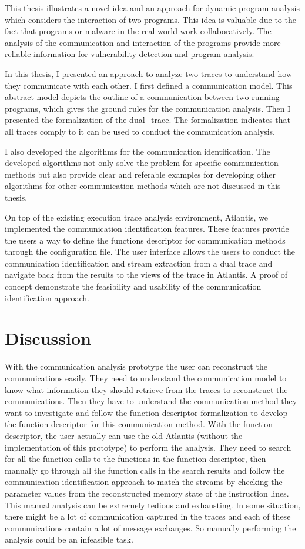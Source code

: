 \label{concl}
This thesis illustrates a novel idea and an approach for dynamic program analysis which considers the interaction of two programs. This idea is valuable due to the fact that programs or malware in the real world work collaboratively. The analysis of the communication and interaction of the programs provide more reliable information for vulnerability detection and program analysis.

In this thesis, I presented an approach to analyze two traces to understand how they communicate with each other. I first defined a communication model. This abstract model depicts the outline of a communication between two running programs, which gives the ground rules for the communication analysis. Then I presented the  formalization of the dual\_trace. The formalization indicates that all traces comply to it can be used to conduct the communication analysis.

I also developed the algorithms for the communication identification. The developed algorithms not only solve the problem for specific communication methods but also provide clear and referable examples for developing other algorithms for other communication methods which are not discussed in this thesis.

On top of the existing execution trace analysis environment, Atlantis, we implemented the communication identification features. These features provide the users a way to define the functions descriptor for communication methods through the configuration file. The user interface allows the users to conduct the communication identification and stream extraction from a dual trace and navigate back from the results to the views of the trace in Atlantis.  A proof of concept demonstrate the feasibility and usability of the communication identification approach. 

\section{Discussion}
With the communication analysis prototype the user can reconstruct the communications easily. They need to understand the communication model to know what information they should retrieve from the traces to reconstruct the communications. Then they have to understand the communication method they want to investigate and follow the function descriptor formalization to develop the function descriptor for this communication method. With the function descriptor, the user actually can use the old Atlantis (without the implementation of this prototype) to perform the analysis. They need to search for all the function calls to the functions in the function descriptor, then manually go through all the function calls in the search results and follow the communication identification approach to match the streams by checking the parameter values from the reconstructed memory state of the instruction lines. This manual analysis can be extremely tedious and exhausting. In some situation, there might be a lot of communication captured in the traces and each of these communications contain a lot of message exchanges. So manually performing the analysis could be an infeasible task.

